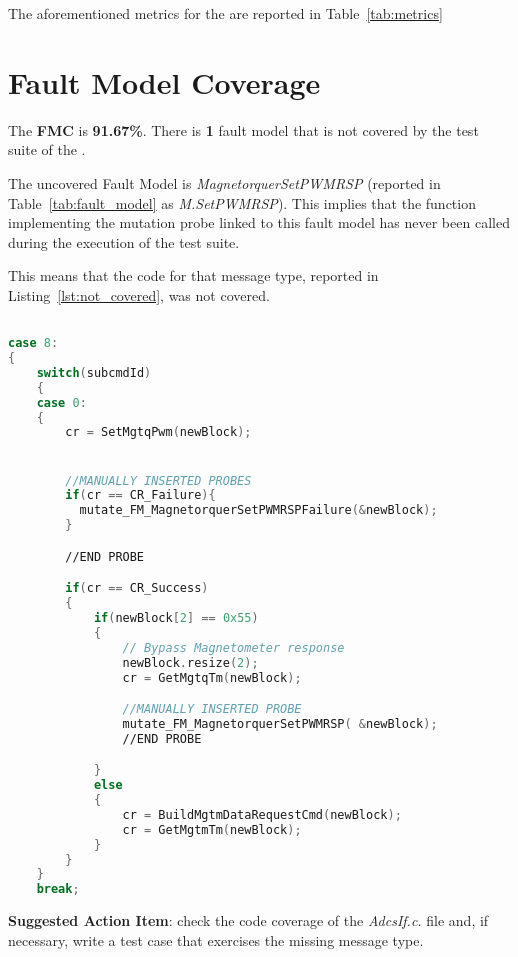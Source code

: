 The aforementioned metrics for the \case are reported in Table~\ref{tab:metrics}



\section{Fault Model Coverage}

The \textbf{FMC} is \textbf{91.67\%}. There is \textbf{1} fault model that is not covered by the test suite of the \case.

The uncovered Fault Model is \emph{MagnetorquerSetPWMRSP} (reported in Table~\ref{tab:fault_model} as \emph{M.SetPWMRSP}). This implies that the function implementing the mutation probe linked to this fault model has never been called during the execution of the test suite.

This means that the code for that message type, reported in Listing~\ref{lst:not_covered}, was not covered.


\begin{lstlisting}[language=C++, caption=Uncovered portion of source code, label={lst:not_covered}]

case 8:
{
    switch(subcmdId)
    {
    case 0:
    {
        cr = SetMgtqPwm(newBlock);


        //MANUALLY INSERTED PROBES
        if(cr == CR_Failure){
          mutate_FM_MagnetorquerSetPWMRSPFailure(&newBlock);
        }

        //END PROBE

        if(cr == CR_Success)
        {
            if(newBlock[2] == 0x55)
            {
                // Bypass Magnetometer response
                newBlock.resize(2);
                cr = GetMgtqTm(newBlock);

                //MANUALLY INSERTED PROBE
                mutate_FM_MagnetorquerSetPWMRSP( &newBlock);
                //END PROBE

            }
            else
            {
                cr = BuildMgtmDataRequestCmd(newBlock);
                cr = GetMgtmTm(newBlock);
            }
        }
    }
    break;


\end{lstlisting}

\textbf{Suggested Action Item}: check the code coverage of the \emph{AdcsIf.c.} file and, if necessary, write a test case that exercises the missing message type.

